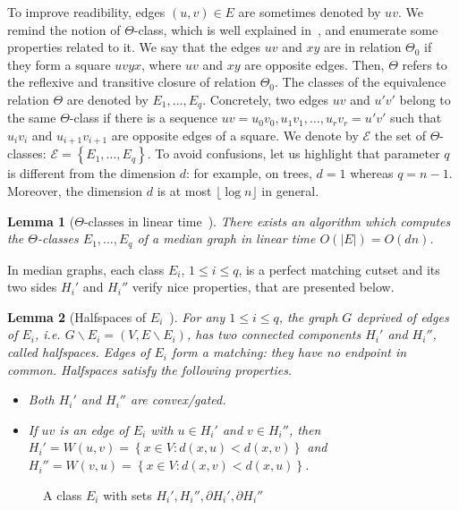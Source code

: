 \documentclass{article}
\newtheorem{lemma}{Lemma}
\newcommand{\set}[1]{\left\{ #1 \right\}}
\newcommand{\card}[1]{\left| #1 \right|}
\begin{document}
To improve readibility, edges $(u,v) \in E$ are sometimes denoted by $uv$. We remind the notion of $\Theta$-class, which is well explained in~\cite{BeChChVa20}, and enumerate some properties related to it. We say that the edges $uv$ and $xy$ are in relation $\Theta_0$ if they form a square $uvyx$, where $uv$ and $xy$ are opposite edges. Then, $\Theta$ refers to the reflexive and transitive closure of relation $\Theta_0$. The classes of the equivalence relation $\Theta$ are denoted by $E_1,\ldots,E_q$. Concretely, two edges $uv$ and $u'v'$ belong to the same $\Theta$-class if there is a sequence $uv = u_0v_0, u_1v_1, \ldots, u_rv_r= u'v'$ such that $u_iv_i$ and $u_{i+1}v_{i+1}$ are opposite edges of a square. We denote by $\mathcal{E}$ the set of $\Theta$-classes: $\mathcal{E} = \set{E_1,\ldots,E_q}$. To avoid confusions, let us highlight that parameter $q$ is different from the dimension $d$: for example, on trees, $d=1$ whereas $q = n-1$. Moreover, the dimension $d$ is at most $\lfloor \log n \rfloor$ in general.

\begin{lemma}[$\Theta$-classes in linear time~\cite{BeChChVa20}]
There exists an algorithm which computes the $\Theta$-classes $E_1,\ldots,E_q$ of a median graph in linear time $O(\card{E}) = O(dn)$.
\label{le:linear_classes}
\end{lemma}

In median graphs, each class $E_i$, $1\le i\le q$, is a perfect matching cutset and its two sides $H_i'$ and $H_i''$ verify nice properties, that are presented below.

\begin{lemma}[Halfspaces of $E_i$~\cite{BeChChVa20,HaImKl99,Mu80}]
For any $1\le i\le q$, the graph $G$ deprived of edges of $E_i$, {\em i.e.} $G\backslash E_i = (V,E\backslash E_i)$, has two connected components $H_i'$ and $H_i''$, called \textit{halfspaces}. Edges of $E_i$ form a matching: they have no endpoint in common. Halfspaces satisfy the following properties.
\begin{itemize}
\item Both $H_i'$ and $H_i''$ are convex/gated.
\item If $uv$ is an edge of $E_i$ with $u \in H_i'$ and $v \in H_i''$, then $H_i' = W(u,v) = \set{x \in V: d(x,u) < d(x,v)}$ and $H_i'' = W(v,u) = \set{x \in V: d(x,v) < d(x,u)}$.
\end{itemize}
\label{le:halfspaces}
\end{lemma}

\begin{figure}[h]
\centering
\scalebox{0.85}{}
\caption{A class $E_i$ with sets $H_i', H_i'', \partial H_i', \partial H_i''$}
\label{fig:halfspaces}
\end{figure}
\end{document}
